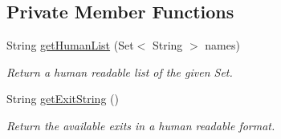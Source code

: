 \subsection*{Private Member Functions}
\begin{DoxyCompactItemize}
\item 
String \hyperlink{classpkg__world_1_1Room_a178f912d90e1eb358fe60f7e5e708058}{get\-Human\-List} (Set$<$ String $>$ names)
\begin{DoxyCompactList}\small\item\em Return a human readable list of the given Set. \end{DoxyCompactList}\item 
String \hyperlink{classpkg__world_1_1Room_ac712fe83b1f0d11c82ebea83f893d0f2}{get\-Exit\-String} ()
\begin{DoxyCompactList}\small\item\em Return the available exits in a human readable format. \end{DoxyCompactList}\end{DoxyCompactItemize}

